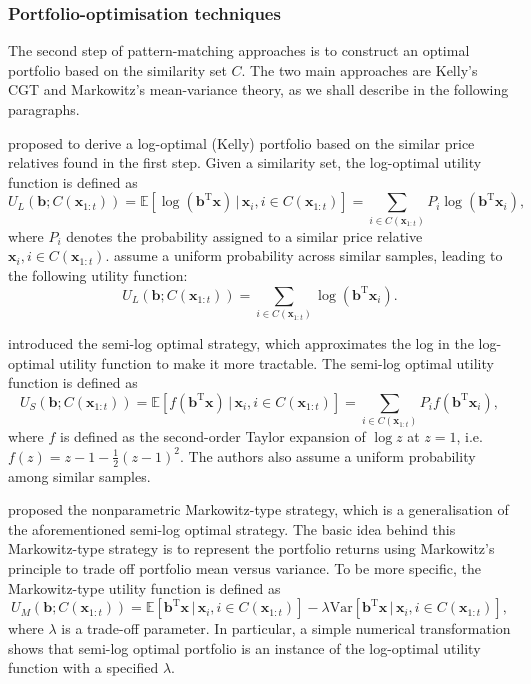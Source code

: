 \subsubsection{Portfolio-optimisation techniques}

The second step of pattern-matching approaches is to construct an optimal portfolio based on the similarity set $C$. The two main approaches are Kelly's CGT and Markowitz's mean-variance theory, as we shall describe in the following paragraphs.

\citet{bnn} proposed to derive a log-optimal (Kelly) portfolio based on the similar price relatives found in the first step. Given a similarity set, the log-optimal utility function is defined as
\begin{equation}
	U_{L}(\mathbf{b}; C(\mathbf{x}_{1:t}))
	= \mathbb{E}[\log(\mathbf{b}^\text{T}\mathbf{x}) \, | \, \mathbf{x}_i, i \in C(\mathbf{x}_{1:t})]
	= \sum_{i \in C(\mathbf{x}_{1:t})} P_i \log(\mathbf{b}^\text{T}\mathbf{x}_i),
\end{equation}
where $P_i$ denotes the probability assigned to a similar price relative $\mathbf{x}_i, i \in C(\mathbf{x}_{1:t})$. \citet{bnn} assume a uniform probability across similar samples, leading to the following utility function:
\begin{equation}
	U_{L}(\mathbf{b}; C(\mathbf{x}_{1:t}))
	= \sum_{i \in C(\mathbf{x}_{1:t})} \log(\mathbf{b}^\text{T}\mathbf{x}_i).
\end{equation}

\citet{gyorfi07} introduced the semi-log optimal strategy, which approximates the log in the log-optimal utility function to make it more tractable. The semi-log optimal utility function is defined as
\begin{equation}
	U_{S}(\mathbf{b}; C(\mathbf{x}_{1:t}))
	= \mathbb{E}[f(\mathbf{b}^\text{T}\mathbf{x}) \, | \, \mathbf{x}_i, i \in C(\mathbf{x}_{1:t})]
	= \sum_{i \in C(\mathbf{x}_{1:t})} P_i f(\mathbf{b}^\text{T}\mathbf{x}_i),
\end{equation}
where $f$ is defined as the second-order Taylor expansion of $\log z$ at $z = 1$, i.e.\ $f(z) = z - 1 -\frac{1}{2}(z-1)^2$. The authors also assume a uniform probability among similar samples.

\citet{ottucsak07} proposed the nonparametric Markowitz-type strategy, which is a generalisation of the aforementioned semi-log optimal strategy. The basic idea behind this Markowitz-type strategy is to represent the portfolio returns using Markowitz's principle to trade off portfolio mean versus variance. To be more specific, the Markowitz-type utility function is defined as
\begin{equation}
	U_{M}(\mathbf{b}; C(\mathbf{x}_{1:t}))
	= \mathbb{E}[\mathbf{b}^\text{T}\mathbf{x} \, | \, \mathbf{x}_i, i \in C(\mathbf{x}_{1:t})] - \lambda\mathrm{Var}[\mathbf{b}^\text{T}\mathbf{x} \, | \, \mathbf{x}_i, i \in C(\mathbf{x}_{1:t})],
\end{equation}
where $\lambda$ is a trade-off parameter. In particular, a simple numerical transformation shows that semi-log optimal portfolio is an instance of the log-optimal utility function with a specified $\lambda$.

